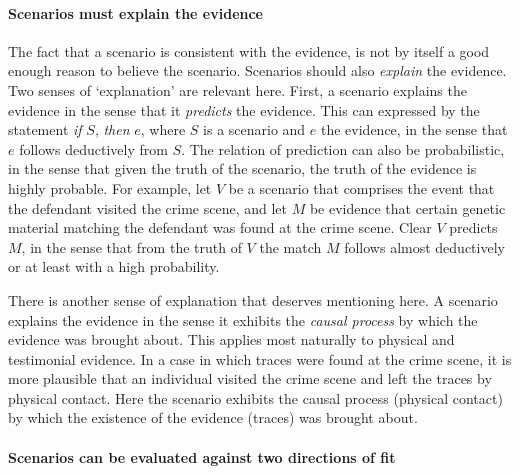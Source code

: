 \documentclass[10pt]{article}
\begin{document}
\paragraph{Scenarios must explain the evidence}

The fact that a scenario is consistent 
with the evidence, is not by itself a good enough reason to believe the scenario. 
Scenarios should also \textit{explain} the evidence. 
Two senses of `explanation' are relevant here. First, 
a scenario explains the evidence in the sense that it \textit{predicts} the evidence. 
This can expressed by the statement \textit{if} $S$, \textit{then} $e$, 
where $S$ is a scenario and $e$ the evidence, in the sense that $e$ 
follows deductively from $S$. The relation of prediction can also be probabilistic, in the sense that given the truth of the scenario, 
the truth of the evidence is highly probable. 
For example, let $V$ be a scenario that comprises the event that the defendant visited the crime scene, and let $M$ be 
evidence that certain genetic material matching the defendant 
was found at the crime scene. Clear $V$ predicts $M$, in the sense that from the truth of $V$
 the match $M$ follows almost deductively or at least with a high probability.  

There is another sense of explanation that deserves mentioning here. 
A scenario explains the evidence in the sense it exhibits the \textit{causal process} by which the evidence 
was brought about. This applies most naturally to physical and testimonial evidence. 
In a case in which traces were found at the crime scene, 
it is more plausible that an individual visited the crime scene 
and left the traces by physical contact. Here the scenario exhibits the causal process (physical contact) 
by which the existence of the evidence 
(traces) was brought about. 

\paragraph{Scenarios can be evaluated against two directions of fit}
\end{document}
